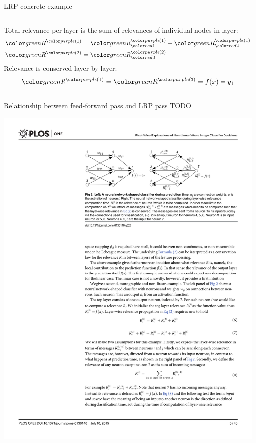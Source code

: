 \documentclass[xetex,compress]{beamer}
\makeatletter
\def\mathcolor#1#{\@mathcolor{#1}}
\def\@mathcolor#1#2#3{%
  \protect\leavevmode
  \begingroup
    \color#1{#2}#3%
  \endgroup
}
\makeatother
\begin{document}
\begin{frame}{LRP concrete example}
\begin{columns}
\begin{column}{0.5\textwidth}
\begin{equation*}
      \end{equation*}
      Total relevance per layer is the sum of relevances of individual nodes in layer:
      \begin{align*}
        \mathcolor{green}{R}^{\mathcolor{purple}{(1)}} &= \mathcolor{green}{R}_{\mathcolor{red}{1}}^{\mathcolor{purple}{(1)}} + \mathcolor{green}{R}_{\mathcolor{red}{2}}^{\mathcolor{purple}{(1)}} \\
        \mathcolor{green}{R}^{\mathcolor{purple}{(2)}} &= \mathcolor{green}{R}_{\mathcolor{red}{3}}^{\mathcolor{purple}{(2)}}
      \end{align*}
      Relevance is conserved layer-by-layer:
      \begin{equation*}
        \mathcolor{green}{R}^{\mathcolor{purple}{(1)}} = \mathcolor{green}{R}^{\mathcolor{purple}{(2)}} = f(x) = y_1
      \end{equation*}
    \end{column}
  \end{columns}
\end{frame}

\begin{frame}{Relationship between feed-forward pass and LRP pass}
  TODO
  \begin{center}
    \includegraphics[width=1.05\textwidth]{./figures/fig2_trimmed.pdf}
  \end{center}
\end{frame}
\end{document}
